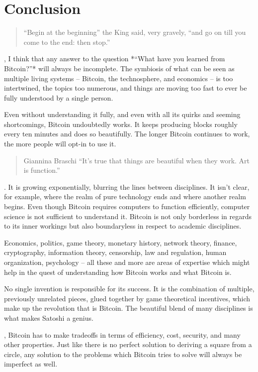 \chapter{Conclusion}
\label{ch:conclusion}

\blockquote{
``Begin at the beginning'' the King said, very gravely, ``and go on till you
come to the end: then stop.''
}

, I think that any answer to the
question *“What have you learned from Bitcoin?”* will always be incomplete. The
symbiosis of what can be seen as multiple living systems -- Bitcoin, the
technosphere, and economics -- is too intertwined, the topics too numerous, and
things are moving too fast to ever be fully understood by a single person.

Even without understanding it fully, and even with all its quirks and seeming
shortcomings, Bitcoin undoubtedly works. It keeps producing blocks roughly every
ten minutes and does so beautifully. The longer Bitcoin continues to work, the
more people will opt-in to use it.

\blockquote{{Giannina Braschi}
``It's true that things are beautiful when they work. Art is function.''
}

. It is growing exponentially,
blurring the lines between disciplines. It isn’t clear, for example, where the
realm of pure technology ends and where another realm begins. Even though
Bitcoin requires computers to function efficiently, computer science is not
sufficient to understand it. Bitcoin is not only borderless in regards to its
inner workings but also boundaryless in respect to academic disciplines.

Economics, politics, game theory, monetary history, network theory, finance,
cryptography, information theory, censorship, law and regulation, human
organization, psychology -- all these and more are areas of expertise which might
help in the quest of understanding how Bitcoin works and what Bitcoin is.

No single invention is responsible for its success. It is the combination of
multiple, previously unrelated pieces, glued together by game theoretical
incentives, which make up the revolution that is Bitcoin. The beautiful blend of
many disciplines is what makes Satoshi a genius.

, Bitcoin has to make tradeoffs in terms
of efficiency, cost, security, and many other properties. Just like there is no
perfect solution to deriving a square from a circle, any solution to the
problems which Bitcoin tries to solve will always be imperfect as well.

